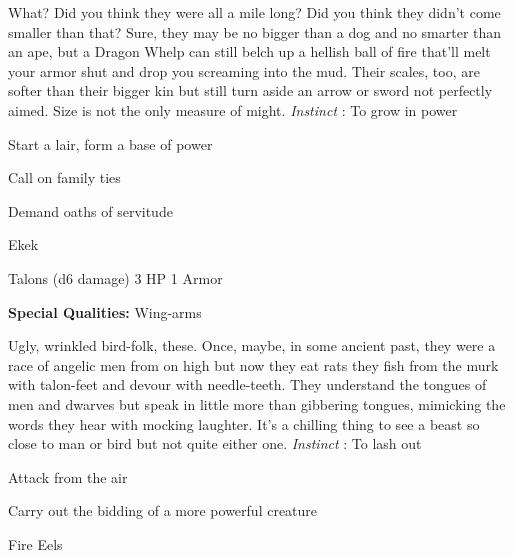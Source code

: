 \startMonsterDescription
What? Did you think they were all a mile long? Did you think they didn’t come smaller than that? Sure, they may be no bigger than a dog and no smarter than an ape, but a Dragon Whelp can still belch up a hellish ball of fire that’ll melt your armor shut and drop you screaming into the mud. Their scales, too, are softer than their bigger kin but still turn aside an arrow or sword not perfectly aimed. Size is not the only measure of might. {\em Instinct} : To grow in power
\stopMonsterDescription
       
\startitemize[1,packed]
         
\item Start a lair, form a base of power

         
\item Call on family ties

         
\item Demand oaths of servitude

       
\stopitemize
       
\startMonsterName
Ekek	 
\stopMonsterName
       

Talons (d6 damage)	3 HP	1 Armor

       


       
\startMonsterQualities
         {\bf Special Qualities:}  Wing-arms
\stopMonsterQualities
       
\startMonsterDescription
Ugly, wrinkled bird-folk, these. Once, maybe, in some ancient past, they were a race of angelic men from on high but now they eat rats they fish from the murk with talon-feet and devour with needle-teeth. They understand the tongues of men and dwarves but speak in little more than gibbering tongues, mimicking the words they hear with mocking laughter. It’s a chilling thing to see a beast so close to man or bird but not quite either one. {\em Instinct} : To lash out
\stopMonsterDescription
       
\startitemize[1,packed]
         
\item Attack from the air

         
\item Carry out the bidding of a more powerful creature

       
\stopitemize
       
\startMonsterName
Fire Eels	 
\stopMonsterName
       

